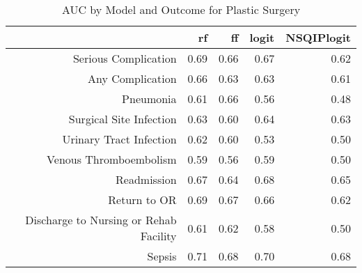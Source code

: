 \begin{table}[ht]
\centering
\begin{tabular}{rrrrr}
  \hline
 & rf & ff & logit & NSQIPlogit \\ 
  \hline
Serious Complication & 0.69 & 0.66 & 0.67 & 0.62 \\ 
  Any Complication & 0.66 & 0.63 & 0.63 & 0.61 \\ 
  Pneumonia & 0.61 & 0.66 & 0.56 & 0.48 \\ 
  Surgical Site Infection & 0.63 & 0.60 & 0.64 & 0.63 \\ 
  Urinary Tract Infection & 0.62 & 0.60 & 0.53 & 0.50 \\ 
  Venous Thromboembolism & 0.59 & 0.56 & 0.59 & 0.50 \\ 
  Readmission & 0.67 & 0.64 & 0.68 & 0.65 \\ 
  Return to OR & 0.69 & 0.67 & 0.66 & 0.62 \\ 
  Discharge to Nursing or Rehab Facility & 0.61 & 0.62 & 0.58 & 0.50 \\ 
  Sepsis & 0.71 & 0.68 & 0.70 & 0.68 \\ 
   \hline
\end{tabular}
\caption{AUC by Model and Outcome for Plastic Surgery} 
\end{table}

